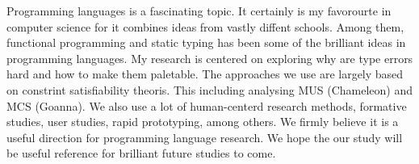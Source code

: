 Programming languages is a fascinating topic. It certainly is my favorourte in computer science for it combines ideas from vastly diffent schools. Among them, functional programming and static typing has been some of the brilliant ideas in programming languages. My research is centered on exploring why are type errors hard and how to make them paletable. The approaches we use are largely based on constrint satisfiability theoris. This including analysing MUS (Chameleon) and MCS (Goanna). We also use a lot of human-centerd research methods, formative studies, user studies, rapid prototyping, among others. We firmly believe it is a useful direction for programming language research. We hope the our study will be useful reference for brilliant future studies to come.





